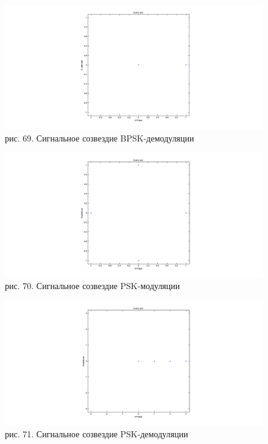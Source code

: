 \documentclass[10pt,a4paper]{report}
\begin{document}
\begin{figure}
\begin{center}
\includegraphics[width=150mm, scale = 0.9]{91_2}\newline
рис. 69. Сигнальное созвездие BPSK-демодуляции\newline
\end{center}
\end{figure}
\begin{figure}
\begin{center}
\includegraphics[width=150mm, scale = 0.9]{91_3}\newline
рис. 70. Сигнальное созвездие PSK-модуляции\newline
\end{center}
\end{figure}
\begin{figure}
\begin{center}
\includegraphics[width=150mm, scale = 0.9]{91_4}\newline
рис. 71. Сигнальное созвездие PSK-демодуляции\newline
\end{center}
\end{figure}
\end{document}
